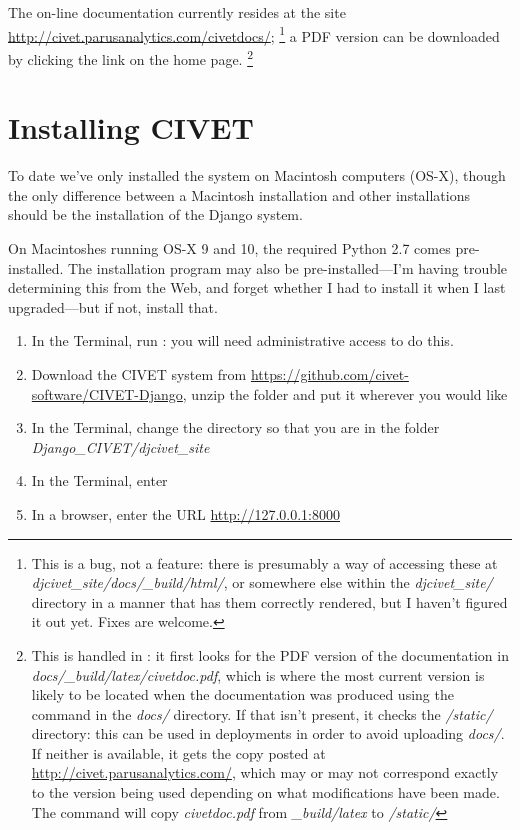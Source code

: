 \documentclass[letterpaper,10pt,english]{sphinxmanual}
\begin{document}
The on-line documentation currently resides at the site \href{http://civet.parusanalytics.com/civetdocs/}{http://civet.parusanalytics.com/civetdocs/}; \footnote{
This is a bug, not a feature: there is presumably a way of accessing these at \emph{djcivet\_site/docs/\_build/html/}, or
somewhere else within the \emph{djcivet\_site/} directory
in a manner that has them correctly rendered, but I haven't figured it out yet. Fixes are welcome.
} a PDF version can
be downloaded by clicking the  link on the home page. \footnote{
This is handled in : it first looks for the PDF version of the documentation in
\emph{docs/\_build/latex/civetdoc.pdf}, which is where the most current version is likely to be located when the
documentation was produced using the  command in the \emph{docs/} directory. If that isn't present,
it checks the \emph{/static/} directory: this can be used in deployments in order to avoid uploading  \emph{docs/}. If neither
is available, it gets the copy posted at \href{http://civet.parusanalytics.com/}{http://civet.parusanalytics.com/}, which may or may not correspond exactly to the
version being used depending on what modifications have been made. The command  will copy \emph{civetdoc.pdf} from
\emph{\_build/latex} to \emph{/static/}
}


\chapter{Installing CIVET}
\label{installing:installing-civet}\label{installing::doc}
To date we’ve only installed the system on Macintosh computers (OS-X), though
the only difference between a Macintosh installation and other
installations should be the installation of the Django system.

On Macintoshes running OS-X 9 and 10, the required Python 2.7 comes
pre-installed. The  installation program may also be
pre-installed—I’m having trouble determining this from the Web, and
forget whether I had to install it when I last upgraded—but if not,
install that.
\begin{enumerate}
\item {} 
In the Terminal, run : you will need
administrative access to do this.

\item {} 
Download the CIVET system from
\href{https://github.com/civet-software/CIVET-Django}{https://github.com/civet-software/CIVET-Django}, unzip the folder and
put it wherever you would like

\item {} 
In the Terminal, change the directory so that you are in the folder
\emph{Django\_CIVET/djcivet\_site}

\item {} 
In the Terminal, enter 

\item {} 
In a browser, enter the URL \href{http://127.0.0.1:8000}{http://127.0.0.1:8000}

\end{enumerate}
\end{document}
